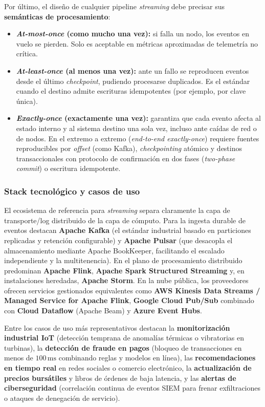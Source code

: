 Por último, el diseño de cualquier pipeline \textit{streaming} debe precisar sus \textbf{semánticas de procesamiento}:
\begin{itemize}
  \item \textbf{\textit{At-most-once} (como mucho una vez):} si falla un nodo, los eventos en vuelo se pierden. Solo es aceptable en métricas aproximadas de telemetría no crítica.
  \item \textbf{\textit{At-least-once} (al menos una vez):} ante un fallo se reproducen eventos desde el último \textit{checkpoint}, pudiendo procesarse duplicados. Es el estándar cuando el destino admite escrituras idempotentes (por ejemplo,  por clave única).
  \item \textbf{\textit{Exactly-once} (exactamente una vez):} garantiza que cada evento afecta al estado interno y al sistema destino una sola vez, incluso ante caídas de red o de nodos. En el extremo a extremo (\textit{end-to-end exactly-once}) requiere fuentes reproducibles por \textit{offset} (como Kafka), \textit{checkpointing} atómico y destinos transaccionales con protocolo de confirmación en dos fases (\textit{two-phase commit}) o escritura idempotente.
\end{itemize}

\subsubsection{Stack tecnológico y casos de uso}

El ecosistema de referencia para \textit{streaming} separa claramente la capa de transporte/log distribuido de la capa de cómputo. Para la ingesta durable de eventos destacan \textbf{Apache Kafka} (el estándar industrial basado en particiones replicadas y retención configurable) y \textbf{Apache Pulsar} (que desacopla el almacenamiento mediante Apache BookKeeper, facilitando el escalado independiente y la multitenencia). En el plano de procesamiento distribuido predominan \textbf{Apache Flink}, \textbf{Apache Spark Structured Streaming} y, en instalaciones heredadas, \textbf{Apache Storm}. En la nube pública, los proveedores ofrecen servicios gestionados equivalentes como \textbf{AWS Kinesis Data Streams / Managed Service for Apache Flink}, \textbf{Google Cloud Pub/Sub} combinado con \textbf{Cloud Dataflow} (Apache Beam) y \textbf{Azure Event Hubs}.

Entre los casos de uso más representativos destacan la \textbf{monitorización industrial IoT} (detección temprana de anomalías térmicas o vibratorias en turbinas), la \textbf{detección de fraude en pagos} (bloqueo de transacciones en menos de $100\,\text{ms}$ combinando reglas y modelos en línea), las \textbf{recomendaciones en tiempo real} en redes sociales o comercio electrónico, la \textbf{actualización de precios bursátiles} y libros de órdenes de baja latencia, y las \textbf{alertas de ciberseguridad} (correlación continua de eventos SIEM para frenar exfiltraciones o ataques de denegación de servicio).

